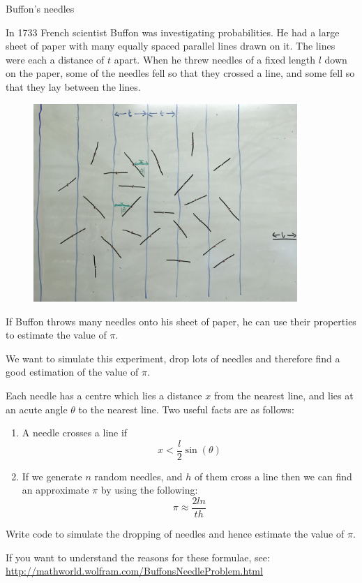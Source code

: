 \documentclass[a4paper]{article}
\begin{document}
\begin{center}
    {\huge{Buffon's needles}}\\

\end{center}

\vskip 0.5cm

In 1733 French scientist Buffon was investigating probabilities. He had a large sheet of paper with many equally spaced parallel lines drawn on it. The lines were each a distance of $t$ apart. When he threw needles of a fixed length $l$ down on the paper, some of the needles fell so that they crossed a line, and some fell so that they lay between the lines. 

\begin{figure}[h]
\includegraphics[width=10cm]{IMG_2491.jpg}
\end{figure}

If Buffon throws many needles onto his sheet of paper, he can use their properties to estimate the value of $\pi$.

We want to simulate this experiment, drop lots of needles and therefore find a good estimation of the value of $\pi$.


Each needle has a centre which lies a distance $x$ from the nearest line, and lies at an acute angle $\theta$ to the nearest line.  Two useful facts are as follows:

\begin{enumerate}


\item  A needle crosses a line if 
\[x < \frac{l}{2} \sin(\theta)\]

\item If we generate $n$ random needles, and $h$ of them cross a line then we can find an approximate $\pi$ by using the following:
\[ \pi \approx \frac{2ln}{th} \]
\end{enumerate}


Write code to simulate the dropping of needles and hence estimate the value of $\pi$.

If you want to understand the reasons for these formulae, see: \\
\url{http://mathworld.wolfram.com/BuffonsNeedleProblem.html}
\end{document}
